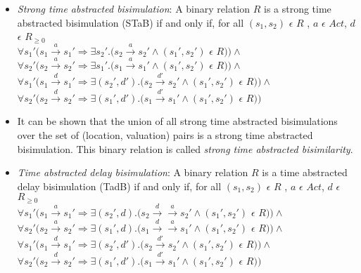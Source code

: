 \documentclass{article}
\begin{document}
\begin{itemize}
  
\item \emph{Strong time abstracted bisimulation}: A binary relation
  $R$ is a strong time abstracted bisimulation (STaB) if and only if, for all
  $(s_1, s_2)$ $\epsilon$ $R$ , $a$ $\epsilon$ $Act $, $d$ $\epsilon$ $R_{\ge 0}$\\
  $\forall s_1' (s_1 \xrightarrow{a} s_1' \Rightarrow \exists s_2'
  . (s_2 \xrightarrow{a} s_2' \wedge (s_1', s_2')$ $\epsilon$ $R ) )
  \wedge $ \\
  $\forall s_2' (s_2 \xrightarrow{a} s_2' \Rightarrow \exists s_1'
  . (s_1 \xrightarrow{a} s_1' \wedge (s_1', s_2')$ $\epsilon$ $R ) ) \wedge $ \\
  $\forall s_1' (s_1 \xrightarrow{d} s_1' \Rightarrow \exists (s_2',
  d')
  . (s_2 \xrightarrow{d'} s_2' \wedge (s_1', s_2')$ $\epsilon$ $R ) )
  \wedge $ \\
  $\forall s_2' (s_2 \xrightarrow{d} s_2' \Rightarrow \exists (s_1', d')
  . (s_1 \xrightarrow{d'} s_1' \wedge (s_1', s_2')$ $\epsilon$ $R ) ) $ \\

\item It can be shown that the union of all strong time abstracted
  bisimulations over the set of (location, valuation) pairs is a
  strong time abstracted bisimulation. This binary relation is called
  \textit{strong time abstracted bisimilarity}.

\item \emph{Time abstracted delay bisimulation}: A binary relation
  $R$ is a time abstracted delay bisimulation (TadB) if and only if, for all
  $(s_1, s_2)$ $\epsilon$ $R$ , $a$ $\epsilon$ $Act $, $d$ $\epsilon$ $R_{\ge 0}$\\
  $\forall s_1' (s_1 \xrightarrow{a} s_1' \Rightarrow \exists (s_2', d)
  . (s_2 \xrightarrow{d} \xrightarrow{a} s_2' \wedge (s_1', s_2')$ $\epsilon$ $R ) )
  \wedge $ \\
  $\forall s_2' (s_2 \xrightarrow{a} s_2' \Rightarrow \exists (s_1', d)
  . (s_1 \xrightarrow{d} \xrightarrow{a} s_1' \wedge (s_1', s_2')$
  $\epsilon$ $R ) ) 
  \wedge $ \\
  $\forall s_1' (s_1 \xrightarrow{d} s_1' \Rightarrow \exists (s_2',
  d')
  . (s_2 \xrightarrow{d'} s_2' \wedge (s_1', s_2')$ $\epsilon$ $R ) )
  \wedge $ \\
  $\forall s_2' (s_2 \xrightarrow{d} s_2' \Rightarrow \exists (s_1', d')
  . (s_1 \xrightarrow{d'} s_1' \wedge (s_1', s_2')$ $\epsilon$ $R ) ) $ \\


\end{itemize}
\end{document}
